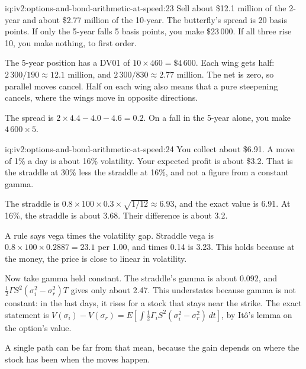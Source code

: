 \begin{solution}{iq:iv2:options-and-bond-arithmetic-at-speed:23}
Sell about \$12.1 million of the 2-year and about \$2.77 million of the 10-year. The butterfly's spread is 20 basis points. If only the 5-year falls 5 basis points, you make \$23\,000. If all three rise 10, you make nothing, to first order.

The 5-year position has a DV01 of $10 \times 460 = \$4\,600$. Each wing gets half: $2\,300/190 \approx 12.1$ million, and $2\,300/830 \approx 2.77$ million. The net is zero, so parallel moves cancel. Half on each wing also means that a pure steepening cancels, where the wings move in opposite directions.

The spread is $2 \times 4.4 - 4.0 - 4.6 = 0.2$. On a fall in the 5-year alone, you make $4\,600 \times 5$.

\end{solution}

\begin{solution}{iq:iv2:options-and-bond-arithmetic-at-speed:24}
You collect about \$6.91. A move of 1\% a day is about 16\% volatility. Your expected profit is about \$3.2. That is the straddle at 30\% less the straddle at 16\%, and not a figure from a constant gamma.

The straddle is $0.8 \times 100 \times 0.3 \times \sqrt{1/12} \approx 6.93$, and the exact value is 6.91. At 16\%, the straddle is about 3.68. Their difference is about 3.2.

A rule says vega times the volatility gap. Straddle vega is $0.8 \times 100 \times 0.2887 = 23.1$ per 1.00, and times 0.14 is 3.23. This holds because at the money, the price is close to linear in volatility.

Now take gamma held constant. The straddle's gamma is about 0.092, and $\tfrac12\Gamma S^2(\sigma_i^2 - \sigma_r^2)T$ gives only about 2.47. This understates because gamma is not constant: in the last days, it rises for a stock that stays near the strike. The exact statement is $V(\sigma_i) - V(\sigma_r) = E\left[\int \tfrac12\Gamma_i S^2(\sigma_i^2 - \sigma_r^2)\,dt\right]$, by Itô's lemma on the option's value.

A single path can be far from that mean, because the gain depends on where the stock has been when the moves happen.

\end{solution}

